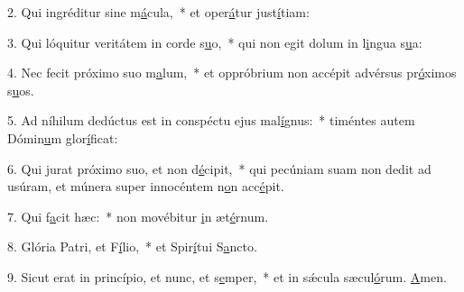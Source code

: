 2. Qui ingréditur sine m\uline{á}cula,~* et oper\uline{á}tur just\uline{í}tiam:\par 
3. Qui lóquitur veritátem in corde s\uline{u}o,~* qui non egit dolum in l\uline{i}ngua s\uline{u}a:\par 
4. Nec fecit próximo suo m\uline{a}lum,~* et oppróbrium non accépit advérsus pr\uline{ó}ximos s\uline{u}os.\par 
5. Ad níhilum dedúctus est in conspéctu ejus mal\uline{í}gnus:~* timéntes autem Dómin\uline{u}m glor\uline{í}ficat:\par 
6. Qui jurat próximo suo, et non d\uline{é}cipit,~* qui pecúniam suam non dedit ad usúram, et múnera super innocéntem n\uline{o}n acc\uline{é}pit.\par 
7. Qui f\uline{a}cit hæc:~* non movébitur \uline{i}n æt\uline{é}rnum.\par 
8. Glória Patri, et F\uline{í}lio,~* et Spir\uline{í}tui S\uline{a}ncto.\par 
9. Sicut erat in princípio, et nunc, et s\uline{e}mper,~* et in sǽcula sæcul\uline{ó}rum. \uline{A}men.\par 

